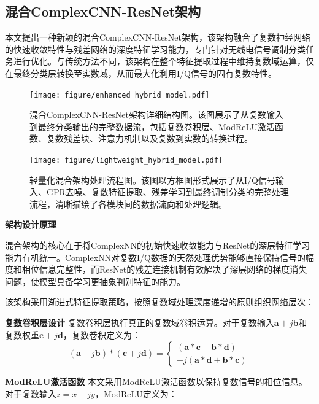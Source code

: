 \documentclass[conference]{IEEEtran}
\begin{document}
\subsection{混合ComplexCNN-ResNet架构}

本文提出一种新颖的混合ComplexCNN-ResNet架构，该架构融合了复数神经网络的快速收敛特性与残差网络的深度特征学习能力，专门针对无线电信号调制分类任务进行优化。与传统方法不同，该架构在整个特征提取过程中维持复数域运算，仅在最终分类层转换至实数域，从而最大化利用I/Q信号的固有复数特性。

\begin{figure}[htbp]
\centering
\texttt{[image: figure/enhanced\_hybrid\_model.pdf]}
\caption{混合ComplexCNN-ResNet架构详细结构图。该图展示了从复数输入到最终分类输出的完整数据流，包括复数卷积层、ModReLU激活函数、复数残差块、注意力机制以及复数到实数的转换过程。}
\label{fig:enhanced_hybrid_model}
\end{figure}


\begin{figure}[htbp]
\centering
\texttt{[image: figure/lightweight\_hybrid\_model.pdf]}
\caption{轻量化混合架构处理流程图。该图以方框图形式展示了从I/Q信号输入、GPR去噪、复数特征提取、残差学习到最终调制分类的完整处理流程，清晰描绘了各模块间的数据流向和处理逻辑。}
\label{fig:lightweight_hybrid_model_flow}
\end{figure}

\textbf{架构设计原理}

混合架构的核心在于将ComplexNN的初始快速收敛能力与ResNet的深层特征学习能力有机统一。ComplexNN对复数I/Q数据的天然处理优势能够直接保持信号的幅度和相位信息完整性，而ResNet的残差连接机制有效解决了深层网络的梯度消失问题，使模型具备学习更抽象判别特征的能力。

该架构采用渐进式特征提取策略，按照复数域处理深度递增的原则组织网络层次：

\textbf{复数卷积层设计} 复数卷积层执行真正的复数域卷积运算。对于复数输入$\mathbf{a} + j\mathbf{b}$和复数权重$\mathbf{c} + j\mathbf{d}$，复数卷积定义为：
\begin{equation}
(\mathbf{a} + j\mathbf{b}) * (\mathbf{c} + j\mathbf{d}) = 
\begin{cases}
(\mathbf{a} * \mathbf{c} - \mathbf{b} * \mathbf{d}) \\
+ j(\mathbf{a} * \mathbf{d} + \mathbf{b} * \mathbf{c})
\end{cases}
\end{equation}

\textbf{ModReLU激活函数} 本文采用ModReLU激活函数以保持复数信号的相位信息。对于复数输入$z = x + jy$，ModReLU定义为：
\end{document}
